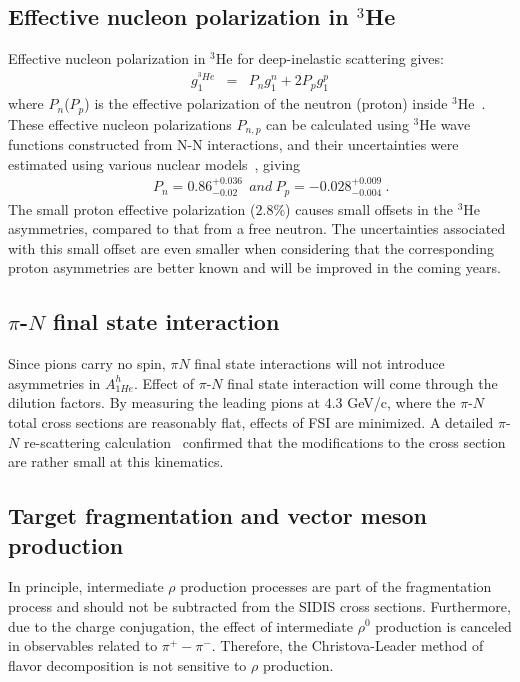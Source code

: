 \subsection{Effective nucleon polarization in $^3$He} \label{ch5:he3model}
Effective nucleon polarization in $^3$He for deep-inelastic scattering gives:
\begin{eqnarray}\label{equ:he3-g1n}
 g_1^{^3 {He}} &=& P_ng_1^n+2P_pg_1^p
\end{eqnarray}
where $P_n$($P_p$) is the effective polarization of the neutron 
(proton) inside $^3$He~\cite{theory:PnPp_friar}.
These effective nucleon polarizations $P_{n,p}$ can be
calculated using $^3$He wave functions constructed from N-N interactions,
and their uncertainties were estimated using various nuclear 
models~\cite{theory:PnPp_nogga,theory:PnPp_friar,theory:3Heconv,theory:PnPp_bissey},
giving 
\begin{eqnarray}
&& P_n=0.86^{+0.036}_{-0.02}~~{and}~P_p=-0.028^{+0.009}_{-0.004}~.\label{equ:PnPp}
\end{eqnarray}
%
The small proton effective polarization ($2.8 \%$) causes small 
offsets in the $^3$He asymmetries, compared to that from a 
free neutron.  The uncertainties associated with this small offset are even smaller
when considering that the corresponding proton asymmetries are better known
 and will be improved in the coming years.


\subsection{$\pi$-$N$ final state interaction }
Since pions carry no spin,  $\pi N$ final state interactions will not introduce 
asymmetries in $A_{1He}^h$. Effect of $\pi$-$N$ final state interaction
will come through the dilution factors. By measuring the leading pions at
$4.3$ GeV/c, where the $\pi$-$N$ total cross sections are reasonably flat, 
effects of FSI are minimized. A detailed $\pi$-$N$ re-scattering calculation~\cite{misak}
confirmed that the modifications to the cross section are rather small at this kinematics.
 

\subsection{Target fragmentation and vector meson production }
 In principle, intermediate $\rho$ production processes are part
 of the fragmentation process and should not be subtracted
 from the SIDIS cross sections. Furthermore, 
 due to the charge conjugation, the effect of intermediate
 $\rho^0$ production is canceled in observables related to
 $\pi^+ - \pi^-$. Therefore, the Christova-Leader method of flavor decomposition
 is not sensitive to $\rho$ production.  

